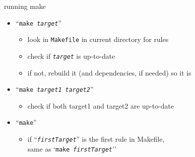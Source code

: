 \begin{frame}{running make}
\begin{itemize}
    \item ``\texttt{make \textit{target}}''
        \begin{itemize}
        \item look in \texttt{Makefile} in current directory for rules
        \item check if \texttt{\textit{target}} is up-to-date
        \item if not, rebuild it (and dependencies, if needed) so it is
        \end{itemize}
    \item ``\texttt{make \textit{target1} \textit{target2}}''
        \begin{itemize}
        \item check if both target1 and target2 are up-to-date
        \end{itemize}
    \item ``\texttt{make}''
        \begin{itemize}
        \item if ``\texttt{\textit{firstTarget}}'' is the first rule in Makefile,\\
            same as `\texttt{make \textit{firstTarget}}''
        \end{itemize}
\end{itemize}
\end{frame}
